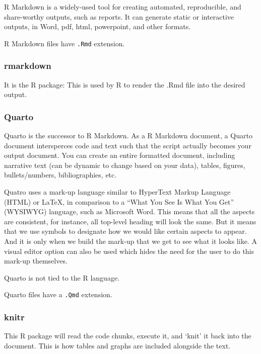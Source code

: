 \documentclass[
  letterpaper,
  DIV=11,
  numbers=noendperiod]{scrreprt}
\begin{document}
R Markdown is a widely-used tool for creating automated, reproducible,
and share-worthy outputs, such as reports. It can generate static or
interactive outputs, in Word, pdf, html, powerpoint, and other formats.

R Markdown files have \texttt{.Rmd} extension.

\hypertarget{rmarkdown}{%
\subsubsection{rmarkdown}\label{rmarkdown}}

It is the R package: This is used by R to render the .Rmd file into the
desired output.

\hypertarget{quarto}{%
\subsubsection{Quarto}\label{quarto}}

Quarto is the successor to R Markdown. As a R Markdown document, a
Quarto document intersperces code and text such that the script actually
becomes your output document. You can create an entire formatted
document, including narrative text (can be dynamic to change based on
your data), tables, figures, bullets/numbers, bibliographies, etc.

Quatro uses a mark-up language similar to HyperText Markup Language
(HTML) or LaTeX, in comparison to a ``What You See Is What You Get''
(WYSIWYG) language, such as Microsoft Word. This means that all the
aspects are consistent, for instance, all top-level heading will look
the same. But it means that we use symbols to designate how we would
like certain aspects to appear. And it is only when we build the mark-up
that we get to see what it looks like. A visual editor option can also
be used which hides the need for the user to do this mark-up themselves.

Quarto is not tied to the R language.

Quarto files have a \texttt{.Qmd} extension.

\hypertarget{knitr}{%
\subsubsection{knitr}\label{knitr}}

This R package will read the code chunks, execute it, and `knit' it back
into the document. This is how tables and graphs are included alongside
the text.
\end{document}
